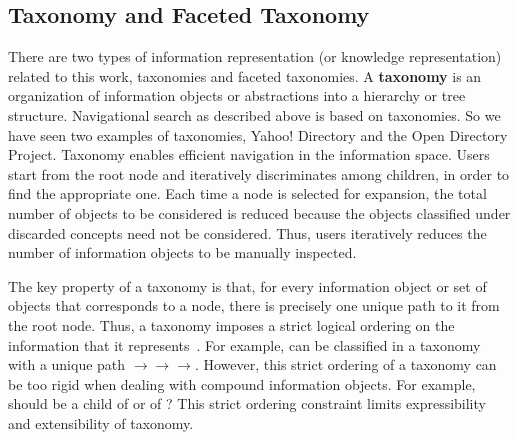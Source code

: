 \subsection{Taxonomy and Faceted Taxonomy}
There are two types of information representation (or knowledge representation) related to this work, taxonomies and faceted taxonomies. A \textbf{taxonomy} is an organization of information objects or abstractions into a hierarchy or tree structure. Navigational search as described above is based on taxonomies. So we have seen two examples of taxonomies, Yahoo! Directory and the Open Directory Project. Taxonomy enables efficient navigation in the information space. Users start from the root node and iteratively discriminates among children, in order to find the appropriate one. Each time a node is selected for expansion, the total number of objects to be considered is reduced because the objects classified under discarded concepts need not be considered. Thus, users iteratively reduces the number of information objects to be manually inspected.~\cite{sacco2009dynamic}

The key property of a taxonomy is that, for every information object or set of objects that corresponds to a node, there is precisely one unique path to it from the root node. Thus, a taxonomy imposes a strict logical ordering on the information that it represents~\cite{tunkelang2009faceted}. For example,  can be classified in a taxonomy with a unique path  $\rightarrow$$\rightarrow$$\rightarrow$. However, this strict ordering of a taxonomy can be too rigid when dealing with compound information objects. For example, should  be a child of  or of ? This strict ordering constraint limits expressibility and extensibility of taxonomy.


